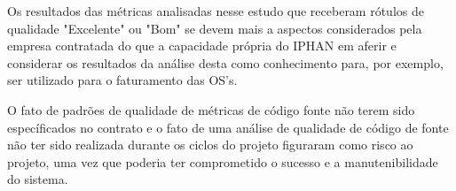 Os resultados das métricas analisadas nesse estudo que receberam rótulos de qualidade "Excelente" ou "Bom" se devem mais a aspectos considerados pela empresa contratada do que a capacidade própria do IPHAN em aferir e considerar os resultados da análise desta como conhecimento para, por exemplo, ser utilizado para o faturamento das OS's.

O fato de padrões de qualidade de métricas de código fonte não terem sido específicados no contrato e o fato de uma análise de qualidade de código de fonte não ter sido realizada durante os ciclos do projeto figuraram como risco ao projeto, uma vez que poderia ter comprometido o sucesso e a manutenibilidade do sistema.